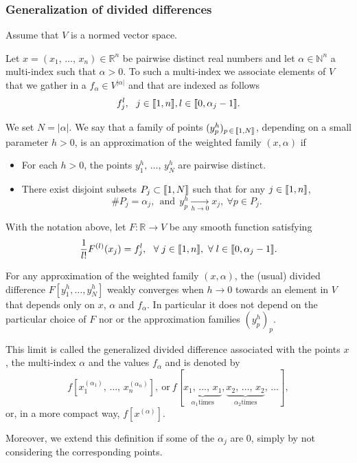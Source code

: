 \documentclass[AHL,Unicode,longabstracts]{cedram}
\newcommand{\llbracket}{\mathopen{[\mkern -2.7mu[}}
\newcommand{\rrbracket}{\mathclose{]\mkern -2.7mu]}}
\newcommand{\inter}[2]{\llbracket #1,#2 \rrbracket}
\newcommand{\N}{\mathbb{N}}
\newcommand{\R}{\mathbb{R}}
\let\oldforall\forall
\renewcommand*{\forall}{\mathrel{\oldforall}}
\begin{document}
\subsubsection{Generalization of divided differences} \label{Subsec:Annexe_DD_generalisees}

Assume that $V$ is a normed vector space.

Let $x=(x_1,\,\dotsc,\,x_n)\in \R^n$ be pairwise distinct real numbers and let $\alpha\in \N^n$ a multi-index such that $\alpha>0$. To such a multi-index we associate elements of $V$ that we gather in a $f_\alpha\in V^{|\alpha|}$ and that are indexed as follows
\[
f_j^l, \ \ j\in \inter{1}{n}, l\in \inter{0}{\alpha_j-1}.
\]



\begin{defi}\label{Def:approximation_weighted_family}
We set $N=|\alpha|$. We say that a family of points $(y_p^h)_{p\,\in\, \inter{1}{N}}$, depending on a small parameter $h>0$, is an approximation of the weighted family $(x,\alpha)$ if
\begin{itemize}
\item For each $h>0$, the points $y_1^h,\,\dotsc,\,y_N^h$ are pairwise distinct.
\item There exist disjoint subsets $P_j\subset \inter{1}{N}$ such that for any $j\in \inter{1}{n}$,
\[
\# P_j = \alpha_j, \ \ \text{and} \ \ y_p^h\xrightarrow[h\to 0]{} x_j,\ \forall p\in P_j.
\]
\end{itemize}
\end{defi}

\begin{prop}\label{Prop:generalised_div_diff}
With the notation above, let $F:\R\to V$ be any smooth function satisfying
\begin{equation}\label{proprietes_F}
\frac{1}{l!} F^{(l)}(x_j) = f_j^l, \ \ \forall j\in \inter{1}{n}, \ \forall l\in \inter{0}{\alpha_j-1}.
\end{equation}

For any approximation of the weighted family $(x,\alpha)$, the (usual) divided difference $F[y_1^h,\dotsc,y_N^h]$ weakly converges when $h\to 0$ towards an element in $V$ that depends only on $x$, $\alpha$ and $f_\alpha$. In particular it does not depend on the particular choice of $F$ nor or the approximation families $(y_p^h)_p$.

This limit is called the generalized divided difference associated with the points $x$, the multi-index $\alpha$ and the values $f_\alpha$ and is denoted by
\[
f[x_1^{(\alpha_1)},\,\dotsc,\,x_n^{(\alpha_n)}], \ \text{or} \ f[\underbrace{x_1,\,\dotsc,\,x_1}_{\alpha_1 \text{times}},\underbrace{x_2,\,\dotsc,\,x_2}_{\alpha_2 \text{times}},\,\dotsc],
\]
or, in a more compact way, $f[x^{(\alpha)}]$.

Moreover, we extend this definition if some of the $\alpha_j$ are $0$, simply by not considering the corresponding points.
\end{prop}
\end{document}
